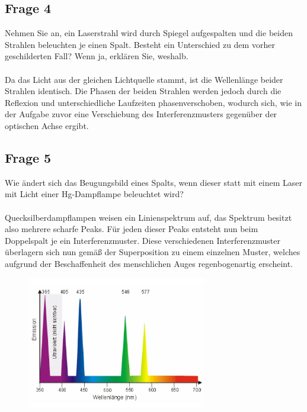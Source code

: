 \documentclass[a4paper,10pt]{scrartcl}
\begin{document}
		\subsection{Frage 4}
		Nehmen Sie an, ein Laserstrahl wird durch Spiegel aufgespalten und die beiden Strahlen beleuchten je einen Spalt. Besteht ein Unterschied zu dem vorher geschilderten Fall? Wenn ja,	erklären Sie, weshalb.\\
		\\
		Da das Licht aus der gleichen Lichtquelle stammt, ist die Wellenlänge beider Strahlen identisch. Die Phasen der beiden Strahlen werden jedoch durch die Reflexion und unterschiedliche Laufzeiten phasenverschoben, wodurch sich, wie in der Aufgabe zuvor eine Verschiebung des Interferenzmusters gegenüber der optischen Achse ergibt.

		\subsection{Frage 5}
		Wie ändert sich das Beugungsbild eines Spalts, wenn dieser statt mit einem Laser mit Licht
		einer Hg-Dampflampe beleuchtet wird?\\
		\\
		Quecksilberdampflampen weisen ein Linienspektrum auf, das Spektrum besitzt also mehrere scharfe Peaks. Für jeden dieser Peaks entsteht nun beim Doppelspalt je ein Interferenzmuster. Diese verschiedenen Interferenzmuster überlagern sich nun gemäß der Superposition zu einem einzelnen Muster, welches aufgrund der Beschaffenheit des menschlichen Auges regenbogenartig erscheint.
		
\FloatBarrier
			\begin{figure}[h]
\centering
\includegraphics[width=0.7\textwidth]{./Bilder/lb2}

\end{figure}
\FloatBarrier
\end{document}
